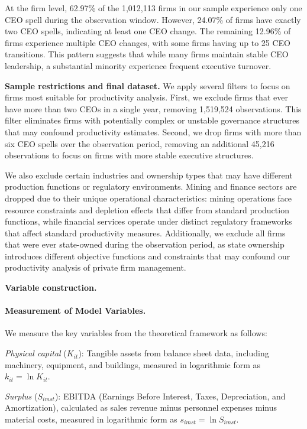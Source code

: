 \documentclass[11pt,a4paper]{article}
\begin{document}
At the firm level, 62.97\% of the 1,012,113 firms in our sample experience only one CEO spell during the observation window. However, 24.07\% of firms have exactly two CEO spells, indicating at least one CEO change. The remaining 12.96\% of firms experience multiple CEO changes, with some firms having up to 25 CEO transitions. This pattern suggests that while many firms maintain stable CEO leadership, a substantial minority experience frequent executive turnover.

\textbf{Sample restrictions and final dataset.} We apply several filters to focus on firms most suitable for productivity analysis. First, we exclude firms that ever have more than two CEOs in a single year, removing 1,519,524 observations. This filter eliminates firms with potentially complex or unstable governance structures that may confound productivity estimates. Second, we drop firms with more than six CEO spells over the observation period, removing an additional 45,216 observations to focus on firms with more stable executive structures.

We also exclude certain industries and ownership types that may have different production functions or regulatory environments. Mining and finance sectors are dropped due to their unique operational characteristics: mining operations face resource constraints and depletion effects that differ from standard production functions, while financial services operate under distinct regulatory frameworks that affect standard productivity measures. Additionally, we exclude all firms that were ever state-owned during the observation period, as state ownership introduces different objective functions and constraints that may confound our productivity analysis of private firm management.

\textbf{Variable construction.} 
\paragraph{Measurement of Model Variables.} We measure the key variables from the theoretical framework as follows:

\textit{Physical capital} ($K_{it}$): Tangible assets from balance sheet data, including machinery, equipment, and buildings, measured in logarithmic form as $k_{it} = \ln K_{it}$.

\textit{Surplus} ($S_{imst}$): EBITDA (Earnings Before Interest, Taxes, Depreciation, and Amortization), calculated as sales revenue minus personnel expenses minus material costs, measured in logarithmic form as $s_{imst} = \ln S_{imst}$.
\end{document}
